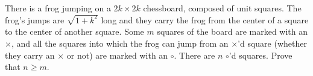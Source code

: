 There is a frog jumping on a $ 2k \times 2k$ chessboard, composed of unit squares. The frog's jumps are $ \sqrt{1 + k^2}$ long and they carry the frog from the center of a square to the center of another square. Some $ m$ squares of the board are marked with an $ \times$,  and all the squares into which the frog can jump from an $ \times$'d square (whether they carry an $ \times$ or not) are marked with an $ \circ$. There are $ n$ $ \circ$'d squares. Prove that $ n \ge m$.
